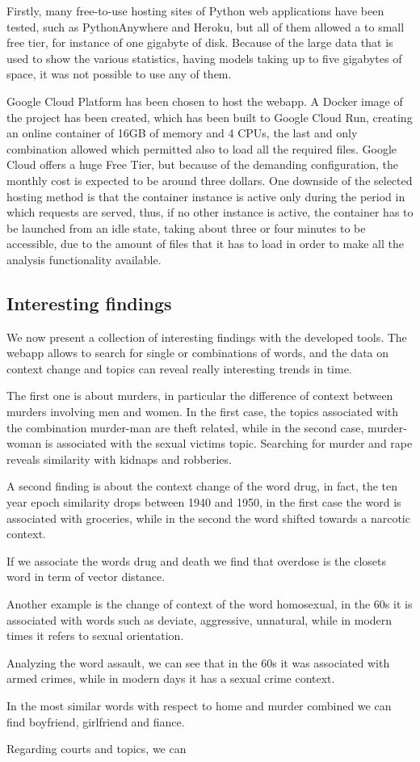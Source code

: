 Firstly, many free-to-use hosting sites of Python web applications have been tested, such as PythonAnywhere and Heroku,
but all of them allowed a to small free tier, for instance of one gigabyte of disk. 
Because of the large data that is used to show the various statistics, having models taking up to five gigabytes of space,
it was not possible to use any of them.

Google Cloud Platform has been chosen to host the webapp. A Docker image of the project has been created, which
has been built to Google Cloud Run, creating an online container of 16GB of memory and 4 CPUs, the last and only combination allowed which permitted also to load all the
required files. 
Google Cloud offers a huge Free Tier, but because of the demanding configuration,
the monthly cost is expected to be around three dollars.
One downside of the selected hosting method is that the container instance is active only during the
period in which requests are served, thus, if no other instance is active, the container has to be launched
from an idle state, taking about three or four minutes to be accessible, due to the amount of files that it
has to load in order to make all the analysis functionality available.

\subsection{Interesting findings}
\label{sec:Interesting findings}

We now present a collection of interesting findings with the developed tools.
The webapp allows to search for single or combinations of words, and the data on context change and topics can 
reveal really interesting trends in time. 

The first one is about murders, in particular the difference of context between murders involving men and 
women. In the first case, the topics associated with the combination murder-man are theft related, while in the 
second case, murder-woman is associated with the sexual victims topic. Searching for murder and rape reveals 
similarity with kidnaps and robberies. 

A second finding is about the context change of the word drug, in fact, the ten year epoch similarity 
drops between 1940 and 1950, in the first case the word is associated with groceries, while in the 
second the word shifted towards a narcotic context.

If we associate the words drug and death we find that overdose is the closets word in term of vector distance.

Another example is the change of context of the word homosexual, in the 60s it is associated with words such as 
deviate, aggressive, unnatural, while in modern times it refers to sexual orientation.

Analyzing the word assault, we can see that in the 60s it was associated with armed crimes, 
while in modern days it has a sexual crime context. 

In the most similar words with respect to home and murder combined we can find boyfriend, girlfriend and fiance.

Regarding courts and topics, we can 